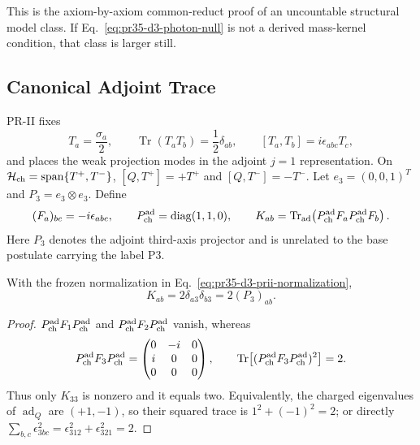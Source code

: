 This is the axiom-by-axiom common-reduct proof of an uncountable structural model class.  If Eq.~\eqref{eq:pr35-d3-photon-null} is not a derived mass-kernel condition, that class is larger still.

\subsection{Canonical Adjoint Trace}

PR-II fixes \cite{PRII}
\begin{equation}
 T_a=\frac{\sigma_a}{2},\qquad
 \operatorname{Tr}(T_aT_b)=\frac12\delta_{ab},\qquad
 [T_a,T_b]=i\epsilon_{abc}T_c,
 \label{eq:pr35-d3-prii-normalization}
\end{equation}
and places the weak projection modes in the adjoint $j=1$ representation.
On $\mathcal H_{\rm ch}=\operatorname{span}\{T^+,T^-\}$,
$[Q,T^+]=+T^+$ and $[Q,T^-]=-T^-$.  Let $e_3=(0,0,1)^T$ and
$P_3=e_3\otimes e_3$.  Define
\begin{equation}
 (F_a)_{bc}=-i\epsilon_{abc},\qquad
 P_{\rm ch}^{\rm ad}=\operatorname{diag}(1,1,0),\qquad
 K_{ab}=\operatorname{Tr}_{\rm ad}
 \!\left(P_{\rm ch}^{\rm ad}F_aP_{\rm ch}^{\rm ad}F_b\right).
 \label{eq:pr35-d3-projected-tensor}
\end{equation}
Here $P_3$ denotes the adjoint third-axis projector and is unrelated to the base postulate carrying the label P3.

\begin{lemma}
\label{lem:pr35-d3-adjoint-trace}
With the frozen normalization in Eq.~\eqref{eq:pr35-d3-prii-normalization},
\begin{equation}
 K_{ab}=2\delta_{a3}\delta_{b3}=2(P_3)_{ab}.
 \label{eq:pr35-d3-k-equals-two-p3}
\end{equation}
\end{lemma}

\begin{proof}
$P_{\rm ch}^{\rm ad}F_1P_{\rm ch}^{\rm ad}$ and
$P_{\rm ch}^{\rm ad}F_2P_{\rm ch}^{\rm ad}$ vanish, whereas
\begin{equation}
 P_{\rm ch}^{\rm ad}F_3P_{\rm ch}^{\rm ad}
 =\begin{pmatrix}0&-i&0\\i&0&0\\0&0&0\end{pmatrix},
 \qquad
 \operatorname{Tr}\!\left[
 (P_{\rm ch}^{\rm ad}F_3P_{\rm ch}^{\rm ad})^2\right]=2.
\end{equation}
Thus only $K_{33}$ is nonzero and it equals two.  Equivalently, the charged eigenvalues of $\operatorname{ad}_Q$ are $(+1,-1)$, so their squared trace is $1^2+(-1)^2=2$; or directly $\sum_{b,c}\epsilon_{3bc}^2=\epsilon_{312}^2+\epsilon_{321}^2=2$.
\end{proof}

